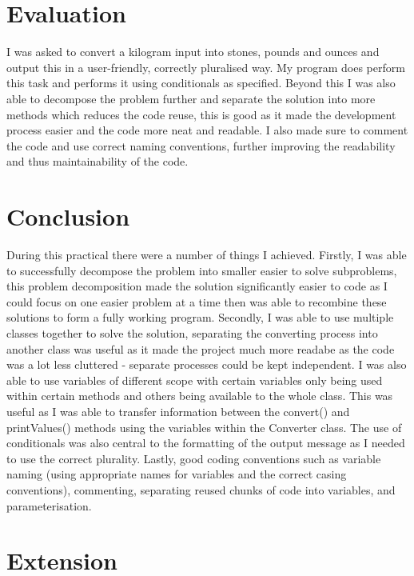 \documentclass[a4paper]{article}
\begin{document}
\section*{Evaluation}
I was asked to convert a kilogram input into stones, pounds and ounces and output this in a user-friendly, correctly pluralised way. My program does 
perform this task and performs it using conditionals as specified. Beyond this I was also able to decompose the 
problem further and separate the solution into more methods which reduces the code reuse, this is good as it made the development process easier and 
the code more neat and readable. I also made sure to comment the code and use correct naming conventions, further improving the readability and thus 
maintainability of the code.

\section*{Conclusion}
During this practical there were a number of things I achieved. Firstly, I was able to successfully decompose the problem into smaller easier to solve 
subproblems, this problem decomposition made the solution significantly easier to code as I could focus on one easier problem at a time then was able 
to recombine these solutions to form a fully working program. Secondly, I was able to use multiple classes together to solve the solution, separating 
the converting process into another class was useful as it made the project much more readabe as the code was a lot less cluttered - separate 
processes could be kept independent. I was also able to use variables of different scope with certain variables only being used within certain methods 
and others being available to the whole class. This was useful as I was able to transfer information between the convert() and printValues() methods 
using the variables within the Converter class. The use of conditionals was also central to the formatting of the output message as I needed to use 
the correct plurality. Lastly, good coding conventions such as variable naming (using appropriate names for variables and the correct casing 
conventions), commenting, separating reused chunks of code into variables, and parameterisation.

\section*{Extension}
\end{document}
